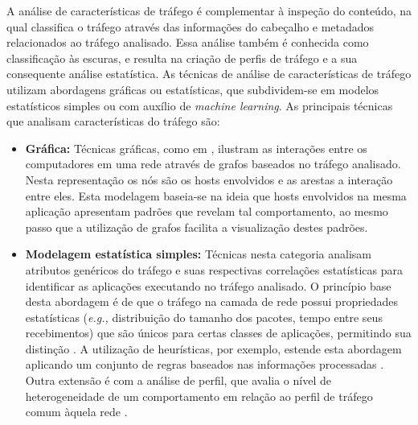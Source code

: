 A análise de características de tráfego é complementar à inspeção do conteúdo, na qual classifica o tráfego através das informações do cabeçalho e metadados relacionados ao tráfego analisado.
%
Essa análise também é conhecida como classificação às escuras, e resulta na criação de perfis de tráfego e a sua consequente análise estatística.
%
As técnicas de análise de características de tráfego utilizam abordagens gráficas ou estatísticas, que subdividem-se em modelos estatísticos simples ou com auxílio de \textit{machine learning}. 
%
As principais  técnicas que analisam características do tráfego são:
	
\begin{itemize}
	\item \textbf{Gráfica: }Técnicas gráficas, como em , ilustram as interações entre os computadores em uma rede através de grafos baseados no tráfego analisado. 
	Nesta representação os nós são os hosts envolvidos e as arestas a interação entre eles. 
	Esta modelagem baseia-se na ideia que hosts envolvidos na mesma aplicação apresentam padrões que revelam tal comportamento, ao mesmo passo que a utilização de grafos facilita a visualização destes padrões.
	
	\item \textbf{Modelagem estatística simples: }Técnicas nesta categoria analisam atributos genéricos do tráfego e suas respectivas correlações estatísticas para identificar as aplicações executando no tráfego analisado. 
	O princípio base desta abordagem é de que o tráfego na camada de rede possui propriedades estatísticas (\textit{e.g.,} distribuição do tamanho dos pacotes, tempo entre seus recebimentos) que são únicos para certas classes de aplicações, permitindo sua distinção \cite{nguyen:2008:machinelearningsurvey}. 
	A utilização de heurísticas, por exemplo, estende esta abordagem aplicando um conjunto de regras baseados nas informações processadas \cite{Karagiannis:2005:Blinc}. 
	Outra extensão é com a análise de perfil, que avalia o nível de heterogeneidade de um comportamento em relação ao perfil de tráfego comum àquela rede \cite{xu:2005:backboneprofiling}.
	

\end{itemize}
